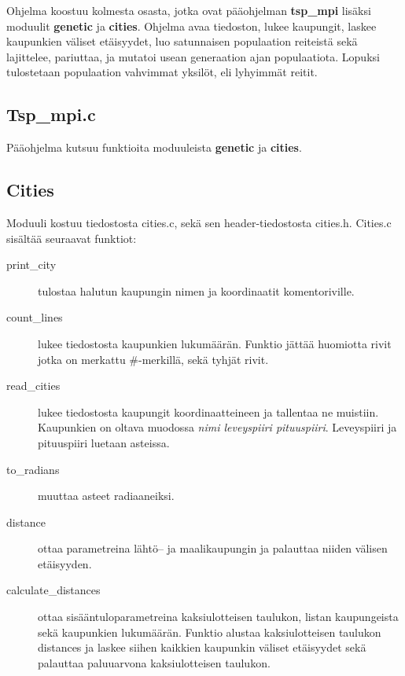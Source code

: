 \documentclass[12pt]{article}
\numberwithin{equation}{section}
\numberwithin{table}{section}
\begin{document}
Ohjelma koostuu kolmesta osasta, jotka ovat pääohjelman \textbf{tsp\_mpi} lisäksi moduulit \textbf{genetic} ja \textbf{cities}. Ohjelma avaa tiedoston, lukee kaupungit, laskee kaupunkien väliset etäisyydet, luo satunnaisen populaation reiteistä sekä lajittelee, pariuttaa, ja mutatoi usean generaation ajan populaatiota. Lopuksi tulostetaan populaation vahvimmat yksilöt, eli lyhyimmät reitit.

\subsection{Tsp\_mpi.c}
Pääohjelma kutsuu funktioita moduuleista \textbf{genetic} ja \textbf{cities}. 

\subsection{Cities}
Moduuli kostuu tiedostosta cities.c, sekä sen header-tiedostosta cities.h. Cities.c sisältää seuraavat funktiot:
\begin{description}
\item[print\_city] tulostaa halutun kaupungin nimen ja koordinaatit komentoriville. 
\item[count\_lines] lukee tiedostosta kaupunkien lukumäärän. Funktio jättää huomiotta rivit jotka on merkattu \#-merkillä, sekä tyhjät rivit.
\item[read\_cities] lukee tiedostosta kaupungit koordinaatteineen ja tallentaa ne muistiin. Kaupunkien on oltava muodossa \emph{nimi leveyspiiri pituuspiiri}. Leveyspiiri ja pituuspiiri luetaan asteissa.
\item[to\_radians] muuttaa asteet radiaaneiksi.
\item[distance] ottaa parametreina lähtö-- ja maalikaupungin ja palauttaa niiden välisen etäisyyden.
\item[calculate\_distances] ottaa sisääntuloparametreina kaksiulotteisen taulukon, listan kaupungeista sekä kaupunkien lukumäärän. Funktio alustaa kaksiulotteisen taulukon distances ja laskee siihen kaikkien kaupunkin väliset etäisyydet sekä palauttaa paluuarvona kaksiulotteisen taulukon.

\end{description}
\end{document}
